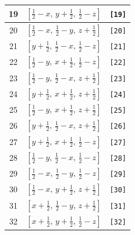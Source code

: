 \documentclass[fleqn,8pt]{jsarticle}
\begin{document}
\begin{longtable}{ccc}
19 & $\left[ \frac{1}{2} - x,\, y + \frac{1}{2},\, \frac{1}{2} - z \right]$ & {\tt [19]} \\ \hline
20 & $\left[ \frac{1}{2} - x,\, \frac{1}{2} - y,\, z + \frac{1}{2} \right]$ & {\tt [20]} \\ \hline
21 & $\left[ y + \frac{1}{2},\, \frac{1}{2} - x,\, \frac{1}{2} - z \right]$ & {\tt [21]} \\ \hline
22 & $\left[ \frac{1}{2} - y,\, x + \frac{1}{2},\, \frac{1}{2} - z \right]$ & {\tt [22]} \\ \hline
23 & $\left[ \frac{1}{2} - y,\, \frac{1}{2} - x,\, z + \frac{1}{2} \right]$ & {\tt [23]} \\ \hline
24 & $\left[ y + \frac{1}{2},\, x + \frac{1}{2},\, z + \frac{1}{2} \right]$ & {\tt [24]} \\ \hline
25 & $\left[ \frac{1}{2} - y,\, x + \frac{1}{2},\, z + \frac{1}{2} \right]$ & {\tt [25]} \\ \hline
26 & $\left[ y + \frac{1}{2},\, \frac{1}{2} - x,\, z + \frac{1}{2} \right]$ & {\tt [26]} \\ \hline
27 & $\left[ y + \frac{1}{2},\, x + \frac{1}{2},\, \frac{1}{2} - z \right]$ & {\tt [27]} \\ \hline
28 & $\left[ \frac{1}{2} - y,\, \frac{1}{2} - x,\, \frac{1}{2} - z \right]$ & {\tt [28]} \\ \hline
29 & $\left[ \frac{1}{2} - x,\, \frac{1}{2} - y,\, \frac{1}{2} - z \right]$ & {\tt [29]} \\ \hline
30 & $\left[ \frac{1}{2} - x,\, y + \frac{1}{2},\, z + \frac{1}{2} \right]$ & {\tt [30]} \\ \hline
31 & $\left[ x + \frac{1}{2},\, \frac{1}{2} - y,\, z + \frac{1}{2} \right]$ & {\tt [31]} \\ \hline
32 & $\left[ x + \frac{1}{2},\, y + \frac{1}{2},\, \frac{1}{2} - z \right]$ & {\tt [32]} \\
\end{longtable}
\end{document}
